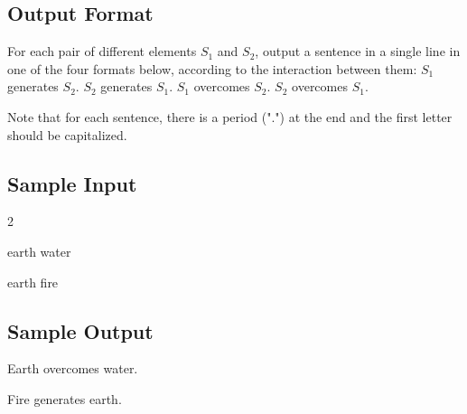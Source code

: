 \subsection{Output Format}

For each pair of different elements $S_1$ and $S_2$, output a sentence in a single line in one of the four formats below, according to the interaction between them:
$S_1$ generates $S_2$.
$S_2$ generates $S_1$.
$S_1$ overcomes $S_2$.
$S_2$ overcomes $S_1$.

Note that for each sentence, there is a period (".") at the end and the first letter should be capitalized.

\subsection{Sample Input}

2

earth water

earth fire

\subsection{Sample Output}

Earth overcomes water.

Fire generates earth.

\clearpage{}